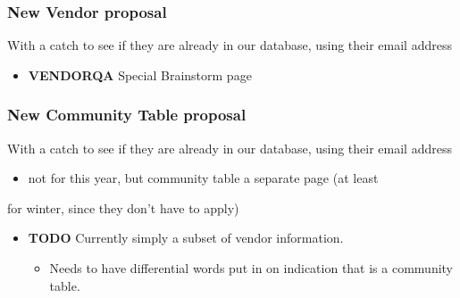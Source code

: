 \documentclass[captions=tablesignature]{scrartcl}
\begin{document}
\subsubsection{New Vendor proposal}
\label{sec-3-1-3}
With a catch to see if they are already in our database, using
their email address
\begin{itemize}
\item {\bfseries\sffamily VENDORQA} Special Brainstorm page
\label{sec-3-1-3-1}
\end{itemize}

\subsubsection{New Community Table proposal}
\label{sec-3-1-4}
With a catch to see if they are already in our database, using
their email address
\begin{itemize}
\item not for this year, but community table a separate page (at least
\end{itemize}
for winter, since they don't have to apply)
\begin{itemize}
\item {\bfseries\sffamily TODO} Currently simply a subset of vendor information.
\label{sec-3-1-4-1}
\begin{itemize}
\item Needs to have differential words put in on indication that is a
community table.
\end{itemize}
\end{itemize}
\end{document}
